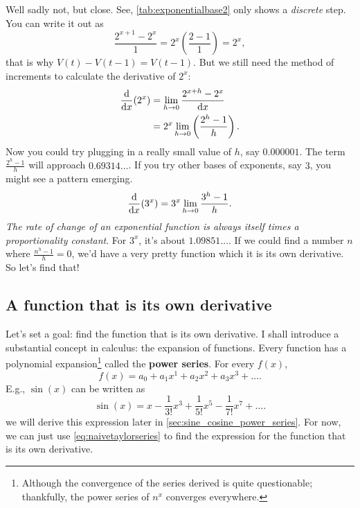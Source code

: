 Well sadly not, but close. See, \cref{tab:exponentialbase2} only shows a \emph{discrete} step. You can write it out as
\begin{equation}
    \frac{2^{x + 1} - 2^x}{1} = 2^x\left(\frac{2 - 1}{1}\right) = 2^x,
\end{equation}
that is why $V(t) - V(t - 1) = V(t - 1)$. But we still need the method of increments to calculate the derivative of $2^x$:
\begin{align*}
    \odv*{(2^x)}{x} &= \lim_{h \appr 0}\frac{2^{x + h} - 2^x}{\odif{x}} \\
    &= 2^x\lim_{h \appr 0}\left(\frac{2^h - 1}{h}\right).
\end{align*}
Now you could try plugging in a really small value of $h$, say $0.000001$. The term $\frac{2^h - 1}{h}$ will approach $0.69314\dots$. If you try other bases of exponents, say $3$, you might see a pattern emerging.
\begin{equation}
    \odv*{(3^x)}{x} = 3^x\lim_{h \appr 0}\frac{3^h - 1}{h}.
\end{equation}
\emph{The rate of change of an exponential function is always itself times a proportionality constant}. For $3^x$, it's about $1.09851\dots$. If we could find a number $n$ where $\frac{n^h - 1}{h} = 0$, we'd have a very pretty function which it is its own derivative. So let's find that!
 
\subsection{A function that is its own derivative}
\label{sec:function_equals_own_derivative}

Let's set a goal: find the function that is its own derivative. I shall introduce a substantial concept in calculus: the expansion of functions. Every function has a polynomial expansion\footnote{Although the convergence of the series derived is quite questionable; thankfully, the power series of $n^x$ converges everywhere.} called the \textbf{power series}. For every $f(x)$,
\begin{equation}
    f(x) = a_0 + a_1x^1 + a_2x^2 + a_3x^3 +\dots. \label{eq:naivetaylorseries}
\end{equation}
E.g., $\sin(x)$ can be written as
\begin{equation}
    \sin(x) = x - \frac{1}{3!}x^3 + \frac{1}{5!}x^5 - \frac{1}{7!}x^7 + \dots. \label{eq:taylorseriessine}
\end{equation}
we will derive this expression later in \cref{sec:sine_cosine_power_series}. For now, we can just use \cref{eq:naivetaylorseries} to find the expression for the function that is its own derivative.

